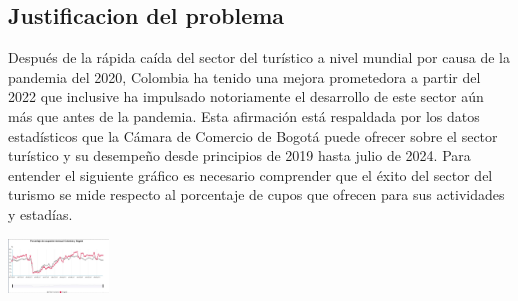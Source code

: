 \subsection{Justificacion del problema}
Después de la rápida caída del sector del turístico a nivel mundial por causa de la pandemia del 2020, Colombia ha tenido una mejora prometedora a partir del 2022 que inclusive ha impulsado notoriamente el desarrollo de este sector aún más que antes de la pandemia. Esta afirmación está respaldada por los datos estadísticos que la Cámara de Comercio de Bogotá puede ofrecer sobre el sector turístico y su desempeño desde principios de 2019 hasta julio de 2024. Para entender el siguiente gráfico es necesario comprender que el éxito del sector del turismo se mide respecto al porcentaje de cupos que ofrecen para sus actividades y estadías. 

\begin{adjustbox}{
    center,
    caption=[{Porcentaje de ocupación mensual: Total nacional y Bogotá}]{\centering Ocupación mensual Bogotá. Fuente: (DANE, Encuesta mensual de alojamiento EMA (enero 2019 - abril 2024))},
    label={ocupaciónmensualbogota},
    nofloat=figure}

    \includegraphics[width=0.2\textwidth]{Content/Images/graficaTurismoBogota.jpeg}

\end{adjustbox}
